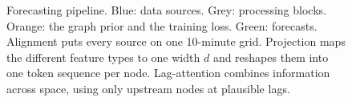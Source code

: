 \documentclass[11pt,a4paper]{article}
\begin{document}
\begin{figure}[H]
{%
}
\caption{Forecasting pipeline. Blue: data sources. Grey: processing blocks.
Orange: the graph prior and the training loss. Green: forecasts. Alignment
puts every source on one 10-minute grid. Projection maps the different
feature types to one width $d$ and reshapes them into one token sequence per
node. Lag-attention combines information across space, using only upstream
nodes at plausible lags.}
\label{fig:arch}
\end{figure}
\end{document}
